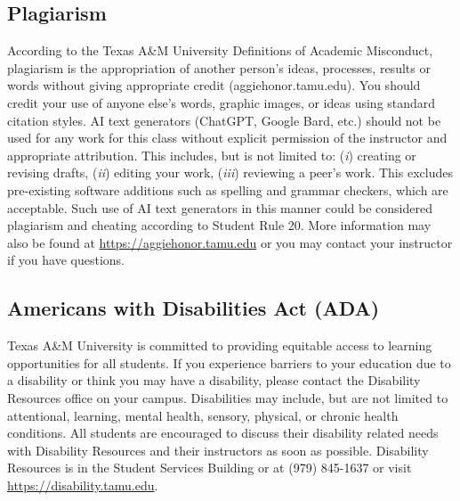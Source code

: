 \documentclass[11pt]{article}
\begin{document}
\subsection*{Plagiarism}
According to the Texas A\&M University Definitions of Academic Misconduct, plagiarism is the appropriation of another person's ideas, processes, results or words without giving appropriate credit (aggiehonor.tamu.edu). You should credit your use of anyone else's words, graphic images, or ideas using standard citation styles. AI text generators (ChatGPT, Google Bard, etc.) should not be used for any work for this class without explicit permission of the instructor and appropriate attribution. This includes, but is not limited to:
(\emph{i}) creating or revising drafts, (\emph{ii}) editing your work, (\emph{iii}) reviewing a peer's work.
This excludes pre-existing software additions such as spelling and grammar checkers, which are acceptable.
Such use of AI text generators in this manner could be considered plagiarism and cheating according to Student Rule 20. More information may also be found at \url{https://aggiehonor.tamu.edu} or you may contact your instructor if you have questions.

\subsection*{Americans with Disabilities Act (ADA)}
Texas A\&M University is committed to providing equitable access to learning opportunities for all students. If you experience barriers to your education due to a disability or think you may have a disability, please contact the Disability Resources office on your campus. Disabilities may include, but are not limited to attentional, learning, mental health, sensory, physical, or chronic health conditions. All students are encouraged to discuss their disability related needs with Disability Resources and their instructors as soon as possible.
Disability Resources is in the Student Services Building or at (979) 845-1637 or visit \url{https://disability.tamu.edu}.

\end{document}

